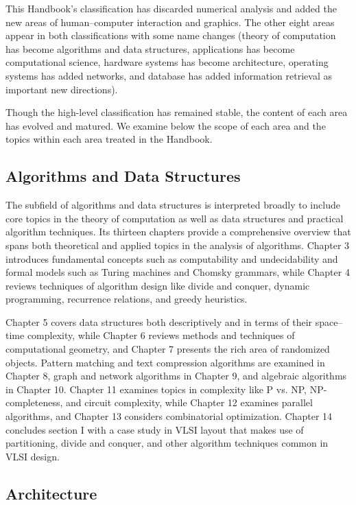 This Handbook's classification has discarded numerical analysis
and added the new areas of human--computer interaction and
graphics. The other eight areas appear in both classifications
with some name changes (theory of computation has become
algorithms and data structures, applications has become
computational science, hardware systems has become architecture,
operating systems has added networks, and database has added
information retrieval as important new directions).

Though the high-level classification has remained stable, the
content of each area has evolved and matured. We examine below the
scope of each area and the topics within each area treated in
the Handbook.

\subsection{Algorithms and Data Structures}

The subfield of algorithms and data structures is interpreted
broadly to include core topics in the theory  of computation as
well as data structures and practical algorithm techniques. Its
thirteen chapters provide a comprehensive overview that spans
both theoretical and applied topics in the analysis of
algorithms. Chapter 3 introduces fundamental concepts such as
computability and undecidability and formal models such as
Turing machines and Chomsky grammars, while Chapter 4 reviews
techniques of algorithm design like divide and conquer, dynamic
programming, recurrence relations, and greedy heuristics.

Chapter 5 covers data structures both descriptively and in
terms of their space--time complexity, while Chapter 6
reviews methods and techniques of computational geometry, and
Chapter 7 presents the rich area of randomized objects.
Pattern matching and text compression algorithms are examined in
Chapter 8, graph and network algorithms in Chapter 9, and
algebraic algorithms in Chapter 10. Chapter 11 examines topics
in complexity like P vs. NP, NP-completeness, and circuit
complexity, while Chapter 12 examines parallel algorithms, and
Chapter 13 considers combinatorial optimization. Chapter 14
concludes section I with a case study in VLSI layout that makes use
of partitioning, divide and conquer, and other algorithm
techniques common in VLSI design.

\subsection{Architecture}

